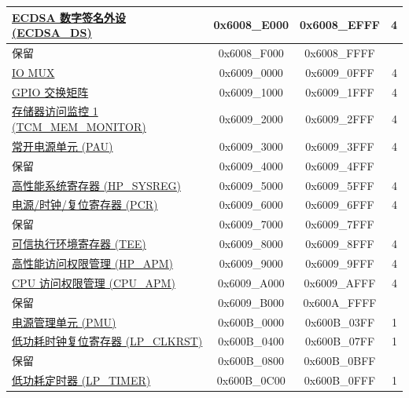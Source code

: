 \begin{ThreePartTable}
\begin{longtable}[c]{ |p{7cm}|c|c|r| }
\hyperref[mod:ecdsa]{ECDSA 数字签名外设 (ECDSA\_DS)}& 0x6008\_E000 & 0x6008\_EFFF &   4     \\\hline
    \rowcolor{gray!25}  保留                    & 0x6008\_F000 & 0x6008\_FFFF &         \\\hline
\hyperref[mod:iomuxgpio]{IO MUX}                      & 0x6009\_0000 & 0x6009\_0FFF &   4     \\\hline
\hyperref[mod:iomuxgpio]{GPIO 交换矩阵}& 0x6009\_1000 & 0x6009\_1FFF &   4     \\\hline
\hyperref[mod:dbgassist]{存储器访问监控 1 (TCM\_MEM\_MONITOR)} \tnote{\textcolor{red}{2}}                & 0x6009\_2000 & 0x6009\_2FFF &   4   \\\hline
\hyperref[mod:lowpowm]{常开电源单元 (PAU)}        & 0x6009\_3000 & 0x6009\_3FFF &   4   \\\hline
\rowcolor{gray!25}  保留                    & 0x6009\_4000 & 0x6009\_4FFF &         \\\hline
\hyperref[mod:sysreg]{高性能系统寄存器 (HP\_SYSREG)}               & 0x6009\_5000 & 0x6009\_5FFF &   4     \\\hline
\hyperref[mod:resclk]{电源/时钟/复位寄存器 (PCR)}                     & 0x6009\_6000 & 0x6009\_6FFF &   4     \\\hline
    \rowcolor{gray!25}  保留                    & 0x6009\_7000 & 0x6009\_7FFF &         \\\hline
\hyperref[mod:permctrl]{可信执行环境寄存器 (TEE)} \tnote{\textcolor{red}{2}}                     & 0x6009\_8000 & 0x6009\_8FFF &   4 \\\hline
\hyperref[mod:permctrl]{高性能访问权限管理 (HP\_APM)}               & 0x6009\_9000 & 0x6009\_9FFF &   4 \\\hline
\hyperref[mod:permctrl]{CPU 访问权限管理 (CPU\_APM)}        & 0x6009\_A000 & 0x6009\_AFFF &    4     \\\hline
    \rowcolor{gray!25}  保留                    & 0x6009\_B000 & 0x600A\_FFFF &         \\\hline
\hyperref[mod:lowpowm]{电源管理单元 (PMU)} & 0x600B\_0000 & 0x600B\_03FF &   1     \\\hline
\hyperref[mod:resclk]{低功耗时钟复位寄存器 (LP\_CLKRST)}                  & 0x600B\_0400 & 0x600B\_07FF &   1     \\\hline
    \rowcolor{gray!25}  保留                    & 0x600B\_0800 & 0x600B\_0BFF &         \\\hline
\hyperref[mod:lowpowm]{低功耗定时器 (LP\_TIMER)}                   & 0x600B\_0C00 & 0x600B\_0FFF &   1     \\\hline

\end{longtable}
\end{ThreePartTable}
